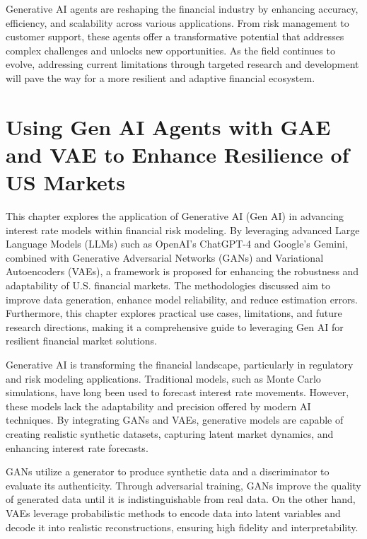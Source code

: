 \documentclass[a4paper,headinclude=on,footinclude=on,12pt,oneside]{scrbook}
\begin{document}
	
	Generative AI agents are reshaping the financial industry by enhancing accuracy, efficiency, and scalability across various applications. From risk management to customer support, these agents offer a transformative potential that addresses complex challenges and unlocks new opportunities. As the field continues to evolve, addressing current limitations through targeted research and development will pave the way for a more resilient and adaptive financial ecosystem.
	
	
	\chapter{Using Gen AI Agents with GAE and VAE to Enhance Resilience of US Markets}
	
	This chapter explores the application of Generative AI (Gen AI) in advancing interest rate models within financial risk modeling. By leveraging advanced Large Language Models (LLMs) such as OpenAI’s ChatGPT-4 and Google’s Gemini, combined with Generative Adversarial Networks (GANs) and Variational Autoencoders (VAEs), a framework is proposed for enhancing the robustness and adaptability of U.S. financial markets. The methodologies discussed aim to improve data generation, enhance model reliability, and reduce estimation errors. Furthermore, this chapter explores practical use cases, limitations, and future research directions, making it a comprehensive guide to leveraging Gen AI for resilient financial market solutions.
	
	
	Generative AI is transforming the financial landscape, particularly in regulatory and risk modeling applications. Traditional models, such as Monte Carlo simulations, have long been used to forecast interest rate movements. However, these models lack the adaptability and precision offered by modern AI techniques. By integrating GANs and VAEs, generative models are capable of creating realistic synthetic datasets, capturing latent market dynamics, and enhancing interest rate forecasts.
	
	GANs utilize a generator to produce synthetic data and a discriminator to evaluate its authenticity. Through adversarial training, GANs improve the quality of generated data until it is indistinguishable from real data. On the other hand, VAEs leverage probabilistic methods to encode data into latent variables and decode it into realistic reconstructions, ensuring high fidelity and interpretability.
	
\end{document}
